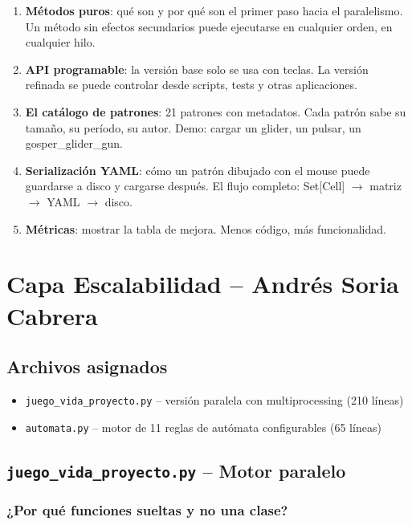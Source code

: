 \documentclass[12pt,a4paper]{article}
\begin{document}
\begin{enumerate}
  \item \textbf{Métodos puros}: qué son y por qué son el primer paso hacia
        el paralelismo. Un método sin efectos secundarios puede ejecutarse
        en cualquier orden, en cualquier hilo.
  \item \textbf{API programable}: la versión base solo se usa con teclas.
        La versión refinada se puede controlar desde scripts, tests y otras
        aplicaciones.
  \item \textbf{El catálogo de patrones}: 21 patrones con metadatos.
        Cada patrón sabe su tamaño, su período, su autor. Demo: cargar
        un glider, un pulsar, un gosper\_glider\_gun.
  \item \textbf{Serialización YAML}: cómo un patrón dibujado con el mouse
        puede guardarse a disco y cargarse después. El flujo completo:
        Set[Cell] $\to$ matriz $\to$ YAML $\to$ disco.
  \item \textbf{Métricas}: mostrar la tabla de mejora. Menos código,
        más funcionalidad.
\end{enumerate}

\newpage

\section{Capa Escalabilidad -- Andrés Soria Cabrera}

\subsection{Archivos asignados}

\begin{itemize}
  \item \texttt{juego\_vida\_proyecto.py} -- versión paralela con multiprocessing (210 líneas)
  \item \texttt{automata.py} -- motor de 11 reglas de autómata configurables (65 líneas)
\end{itemize}

\subsection{\texttt{juego\_vida\_proyecto.py} -- Motor paralelo}

\subsubsection{¿Por qué funciones sueltas y no una clase?}
\end{document}
